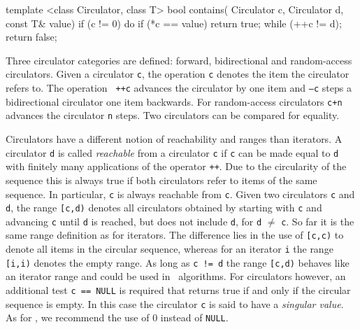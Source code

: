 \begin{ccExampleCode}
template <class Circulator, class T>
bool contains( Circulator c, Circulator d, const T& value) {
    if (c != 0) {
        do {
            if (*c == value)
                return true;
        } while (++c != d);
    }
    return false;
}
\end{ccExampleCode}

\noindent
Three circulator categories are defined: forward, bidirectional and
random-access circulators. Given a circulator {\tt c}, the operation
{\tt *c} denotes the item the circulator refers to. The operation {\tt
  ++c} advances the circulator by one item and {\tt --c} steps a
bidirectional circulator one item backwards. For random-access
circulators {\tt c+n} advances the circulator {\tt n} steps.  Two
circulators can be compared for equality.

Circulators have a different notion of reachability and ranges than
iterators. A circulator {\tt d} is called {\em reachable\/} from a
circulator {\tt c} if {\tt c} can be made equal to {\tt d} with
finitely many applications of the operator {\tt ++}. Due to the
circularity of the sequence this is always true if both circulators
refer to items of the same sequence. In particular, {\tt c} is always
reachable from {\tt c}. Given two circulators {\tt c} and {\tt d}, the
range {\tt [c,d)} denotes all circulators obtained by starting with
{\tt c} and advancing {\tt c} until {\tt d} is reached, but does not
include {\tt d}, for {\tt d} $\neq$ {\tt c}.  So far it is the same
range definition as for iterators.  The difference lies in the use of
{\tt [c,c)} to denote all items in the circular sequence, whereas for
an iterator {\tt i} the range {\tt [i,i)} denotes the empty range.  As
long as {\tt c != d} the range {\tt[c,d)} behaves like an iterator
range and could be used in \stl\ algorithms. For circulators however,
an additional test {\tt c == NULL} is required that returns true if
and only if the circular sequence is empty. In this case the
circulator {\tt c} is said to have a {\em singular value}.  As for
\CC, we recommend the use of 0 instead of {\tt NULL}.

